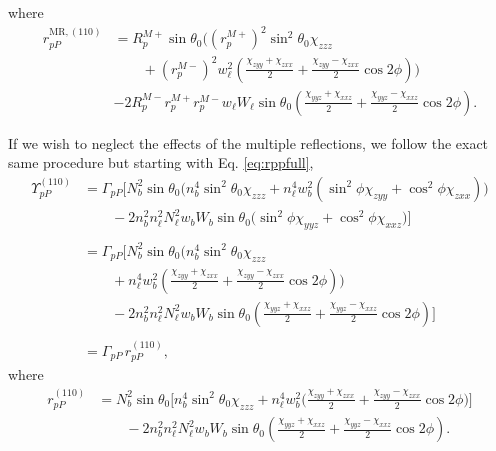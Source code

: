 where
\begin{equation}\label{eq:final-rpp.mr.110}
\begin{split}
r^{\mathrm{MR},(110)}_{pP} &=
R^{M+}_{p}\sin\theta_{0}
\bigg(
\left(r^{M+}_{p}\right)^{2}\sin^{2}\theta_{0}\chi_{zzz}\\
&\qquad+ \left(r^{M-}_{p}\right)^{2}w^{2}_{\ell}
\left(
\frac{\chi_{zyy} + \chi_{zxx}}{2} + \frac{\chi_{zyy} - \chi_{zxx}}{2}\cos2\phi
\right)
\bigg)\\
&- 2R^{M-}_{p}r^{M+}_{p}r^{M-}_{p}w_{\ell}W_{\ell}\sin\theta_{0}
\left(
\frac{\chi_{yyz} + \chi_{xxz}}{2} + \frac{\chi_{yyz} - \chi_{xxz}}{2}\cos2\phi
\right).
\end{split}
\end{equation}

If we wish to neglect the effects of the multiple reflections, we follow the
exact same procedure but starting with Eq. \eqref{eq:rppfull},
\begin{equation*}
\begin{split}
\Upsilon^{(110)}_{pP} &=
\Gamma_{pP}
\bigg[
N^{2}_{b}\sin\theta_{0}
\bigg(
n^{4}_{b}\sin^{2}\theta_{0}\chi_{zzz}
+ n^{4}_{\ell}w^{2}_{b}(\sin^{2}\phi\chi_{zyy} + \cos^{2}\phi\chi_{zxx})
\bigg)\\
&\qquad- 2n^{2}_{b}n^{2}_{\ell}N^{2}_{\ell}w_{b}W_{b}\sin\theta_{0}
\big(
\sin^{2}\phi\chi_{yyz} + \cos^{2}\phi\chi_{xxz}
\big)
\bigg]\\\\
&=
\Gamma_{pP}
\bigg[
N^{2}_{b}\sin\theta_{0}
\bigg(
n^{4}_{b}\sin^{2}\theta_{0}\chi_{zzz}\\
&\qquad+ n^{4}_{\ell}w^{2}_{b}
\left(
\frac{\chi_{zyy} + \chi_{zxx}}{2} + \frac{\chi_{zyy} - \chi_{zxx}}{2}\cos2\phi
\right)
\bigg)\\
&\qquad- 2n^{2}_{b}n^{2}_{\ell}N^{2}_{\ell}w_{b}W_{b}\sin\theta_{0}
\left(
\frac{\chi_{yyz} + \chi_{xxz}}{2} + \frac{\chi_{yyz} - \chi_{xxz}}{2}\cos2\phi
\right)
\bigg]\\\\
&= \Gamma_{pP}\,r^{(110)}_{pP},
\end{split}
\end{equation*}
where
\begin{equation}\label{eq:final-rpp.110}
\begin{split}
r^{(110)}_{pP} &= 
N^{2}_{b}\sin\theta_{0}
\bigg[
n^{4}_{b}\sin^{2}\theta_{0}\chi_{zzz}
+ n^{4}_{\ell}w^{2}_{b}
\bigg(
\frac{\chi_{zyy} + \chi_{zxx}}{2} + \frac{\chi_{zyy} - \chi_{zxx}}{2}\cos2\phi
\bigg)
\bigg]\\
&\qquad- 2n^{2}_{b}n^{2}_{\ell}N^{2}_{\ell}w_{b}W_{b}\sin\theta_{0}
\left(
\frac{\chi_{yyz} + \chi_{xxz}}{2} + \frac{\chi_{yyz} - \chi_{xxz}}{2}\cos2\phi
\right).
\end{split}
\end{equation}


